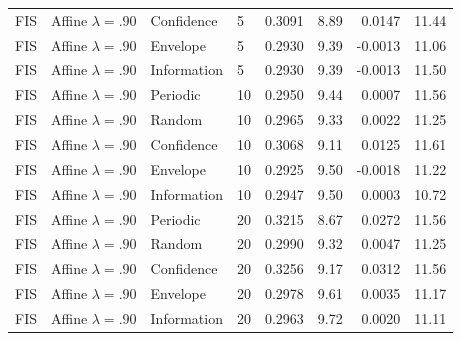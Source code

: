 \begin{longtable}{llllrrrr}
FIS & Affine $\lambda=.90$ & Confidence & 5 & 0.3091 & 8.89 & 0.0147 & 11.44 \\
FIS & Affine $\lambda=.90$ & Envelope & 5 & 0.2930 & 9.39 & -0.0013 & 11.06 \\
FIS & Affine $\lambda=.90$ & Information & 5 & 0.2930 & 9.39 & -0.0013 & 11.50 \\
FIS & Affine $\lambda=.90$ & Periodic & 10 & 0.2950 & 9.44 & 0.0007 & 11.56 \\
FIS & Affine $\lambda=.90$ & Random & 10 & 0.2965 & 9.33 & 0.0022 & 11.25 \\
FIS & Affine $\lambda=.90$ & Confidence & 10 & 0.3068 & 9.11 & 0.0125 & 11.61 \\
FIS & Affine $\lambda=.90$ & Envelope & 10 & 0.2925 & 9.50 & -0.0018 & 11.22 \\
FIS & Affine $\lambda=.90$ & Information & 10 & 0.2947 & 9.50 & 0.0003 & 10.72 \\
FIS & Affine $\lambda=.90$ & Periodic & 20 & 0.3215 & 8.67 & 0.0272 & 11.56 \\
FIS & Affine $\lambda=.90$ & Random & 20 & 0.2990 & 9.32 & 0.0047 & 11.25 \\
FIS & Affine $\lambda=.90$ & Confidence & 20 & 0.3256 & 9.17 & 0.0312 & 11.56 \\
FIS & Affine $\lambda=.90$ & Envelope & 20 & 0.2978 & 9.61 & 0.0035 & 11.17 \\
FIS & Affine $\lambda=.90$ & Information & 20 & 0.2963 & 9.72 & 0.0020 & 11.11 \\
\end{longtable}\normalsize
